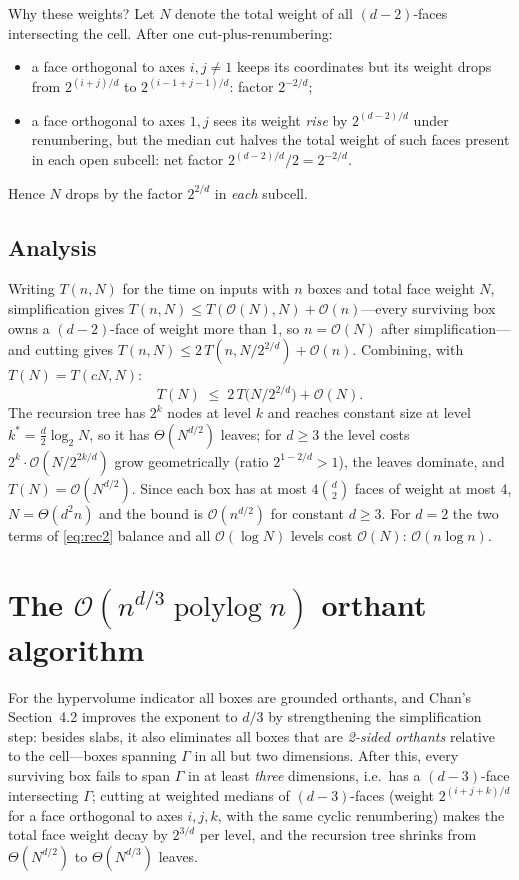 \documentclass[11pt,a4paper]{article}
\theoremstyle{remark}
\newcommand{\Oh}{\mathcal{O}}
\begin{document}
Why these weights?  Let $N$ denote the total weight of all $(d{-}2)$-faces
intersecting the cell.  After one cut-plus-renumbering:
\begin{itemize}\itemsep1pt
\item a face orthogonal to axes $i,j\neq 1$ keeps its coordinates but its
  weight drops from $2^{(i+j)/d}$ to $2^{(i-1+j-1)/d}$: factor $2^{-2/d}$;
\item a face orthogonal to axes $1,j$ sees its weight \emph{rise} by
  $2^{(d-2)/d}$ under renumbering, but the median cut halves the total weight
  of such faces present in each open subcell: net factor
  $2^{(d-2)/d}/2=2^{-2/d}$.
\end{itemize}
Hence $N$ drops by the factor $2^{2/d}$ in \emph{each} subcell.

\subsection{Analysis}
\label{sec:analysis2}

Writing $T(n,N)$ for the time on inputs with $n$ boxes and total face weight
$N$, simplification gives $T(n,N)\le T(\Oh(N),N)+\Oh(n)$---every surviving box
owns a $(d{-}2)$-face of weight more than 1, so $n=\Oh(N)$ after
simplification---and cutting gives $T(n,N)\le 2\,T(n,N/2^{2/d})+\Oh(n)$.
Combining, with $T(N)=T(cN,N)$:
\begin{equation}
T(N)\;\le\; 2\,T\!\bigl(N/2^{2/d}\bigr)+\Oh(N).
\label{eq:rec2}
\end{equation}
The recursion tree has $2^k$ nodes at level $k$ and reaches constant size at
level $k^\ast=\tfrac d2\log_2 N$, so it has $\Theta(N^{d/2})$ leaves; for
$d\ge 3$ the level costs $2^k\cdot \Oh(N/2^{2k/d})$ grow geometrically
(ratio $2^{1-2/d}>1$), the leaves dominate, and $T(N)=\Oh(N^{d/2})$.  Since
each box has at most $4\binom d2$ faces of weight at most 4,
$N=\Theta(d^2 n)$ and the bound is $\Oh(n^{d/2})$ for constant $d\ge3$.  For
$d=2$ the two terms of \eqref{eq:rec2} balance and all
$\Oh(\log N)$ levels cost $\Oh(N)$: $\Oh(n\log n)$.

\section{The $\Oh(n^{d/3}\operatorname{polylog} n)$ orthant algorithm}
\label{sec:dby3}

For the hypervolume indicator all boxes are grounded orthants, and Chan's
Section~4.2 improves the exponent to $d/3$ by strengthening the
simplification step: besides slabs, it also eliminates all boxes that are
\emph{2-sided orthants} relative to the cell---boxes spanning $\Gamma$ in all
but two dimensions.  After this, every surviving box fails to span $\Gamma$
in at least \emph{three} dimensions, i.e.\ has a $(d{-}3)$-face intersecting
$\Gamma$; cutting at weighted medians of $(d{-}3)$-faces (weight
$2^{(i+j+k)/d}$ for a face orthogonal to axes $i,j,k$, with the same cyclic
renumbering) makes the total face weight decay by $2^{3/d}$ per level, and
the recursion tree shrinks from $\Theta(N^{d/2})$ to $\Theta(N^{d/3})$
leaves.
\end{document}
